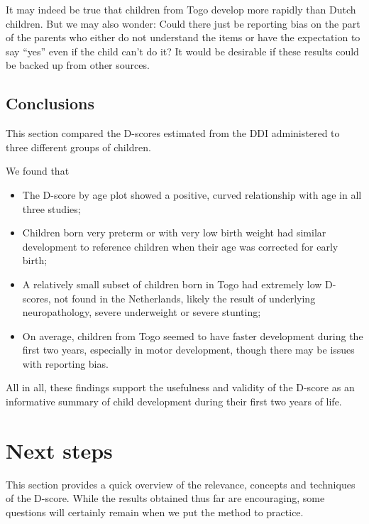 \documentclass[
]{book}
\begin{document}
It may indeed be true that children from Togo develop more rapidly than Dutch children. But we may also wonder: Could there just be reporting bias on the part of the parents who either do not understand the items or have the expectation to say ``yes'' even if the child can't do it? It would be desirable if these results could be backed up from other sources.

\hypertarget{sec:threestudiesconclusions}{%
\section{Conclusions}\label{sec:threestudiesconclusions}}

This section compared the D-scores estimated from the DDI administered to three different groups of children.

We found that

\begin{itemize}
\item
  The D-score by age plot showed a positive, curved relationship with age in all three studies;
\item
  Children born very preterm or with very low birth weight had similar development to reference children when their age was corrected for early birth;
\item
  A relatively small subset of children born in Togo had extremely low D-scores, not found in the Netherlands, likely the result of underlying neuropathology, severe underweight or severe stunting;
\item
  On average, children from Togo seemed to have faster development during the first two years, especially in motor development, though there may be issues with reporting bias.
\end{itemize}

All in all, these findings support the usefulness and validity of the D-score as an informative summary of child development during their first two years of life.

\hypertarget{ch:nextsteps}{%
\chapter{Next steps}\label{ch:nextsteps}}

This section provides a quick overview of the relevance, concepts and techniques of the D-score. While the results obtained thus far are encouraging, some questions will certainly remain when we put the method to practice.
\end{document}
